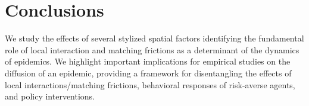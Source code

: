 \documentclass[english,11pt]{article}
\begin{document}
\section{Conclusions} 

We study the effects of several stylized spatial factors identifying the fundamental role of local interaction and matching frictions as a determinant of the dynamics of epidemics. We highlight important implications for empirical studies on the diffusion of an epidemic, providing a framework for disentangling the effects of local interactions/matching frictions, behavioral responses of risk-averse agents, and policy interventions. 

\newpage


\end{document}

